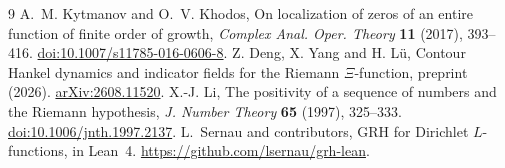 \documentclass[11pt]{article}
\begin{document}
\begin{thebibliography}{9}\small
{} A.~M. Kytmanov and O.~V. Khodos, On localization of zeros of an entire function of finite order of growth, \emph{Complex Anal. Oper. Theory} \textbf{11} (2017), 393--416. \href{https://doi.org/10.1007/s11785-016-0606-8}{doi:10.1007/s11785-016-0606-8}.
 Z. Deng, X. Yang and H. L\"u, Contour Hankel dynamics and indicator fields for the Riemann $\Xi$-function, preprint (2026). \href{https://arxiv.org/abs/2608.11520}{arXiv:2608.11520}.
 X.-J. Li, The positivity of a sequence of numbers and the Riemann hypothesis, \emph{J. Number Theory} \textbf{65} (1997), 325--333. \href{https://doi.org/10.1006/jnth.1997.2137}{doi:10.1006/jnth.1997.2137}.
 L.~Sernau and contributors, GRH for Dirichlet $L$-functions, in Lean~4. \url{https://github.com/lsernau/grh-lean}.
\end{thebibliography}
\end{document}
